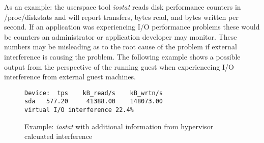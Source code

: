 \indent As an example: the userspace tool \emph{iostat} reads disk performance counters in /proc/diskstats and will report transfers, bytes read, and bytes written per second.  If an application was experiencing I/O performance problems these would be counters an administrator or application developer may monitor.  These numbers may be misleading as to the root cause of the problem if external interference is causing the problem.  The following example shows a possible output from the perspective of the running guest when experienceing I/O interference from external guest machines.
\begin{figure}[h]
\begin{Verbatim}
Device:  tps    kB_read/s    kB_wrtn/s
sda   577.20     41388.00    148073.00
virtual I/O interference 22.4%     
\end{Verbatim}
\label{fig:iostat}
\caption{Example:  \emph{iostat} with additional information from hypervisor calcuated interference}
\end{figure}


\begin{comment}
\subsection{Disk Pinning}
Disk pinning may be a solution for multiple I/O bound guest appliations running in a virtual system.  Several papers have demonstrated the effects of core pinning or \emph{core affinity} for CPU bound applications, which can reduce the load on the hypervisor and prevent cache contention.  Similarly, a multiple I/O bound guests may use a single disk excessivley causing interference and degreaded performance.  By increasing the number of physical spindles, multiple random disk seeks can occur concurrently.  By setting physical disks to specific virtual guests, we can reduce I/O interference from multiple guests.  For applications that are bound by virtual I/O resources, it may be better to share cores and separate physical disks for each virtual machine.  At some point assigning a dedicated physical resource to guest machines minimizes the benefits of virtualizaion.  It should be the task of the administrator to decide how the physical resources are used based on the need.
\end{comment}
